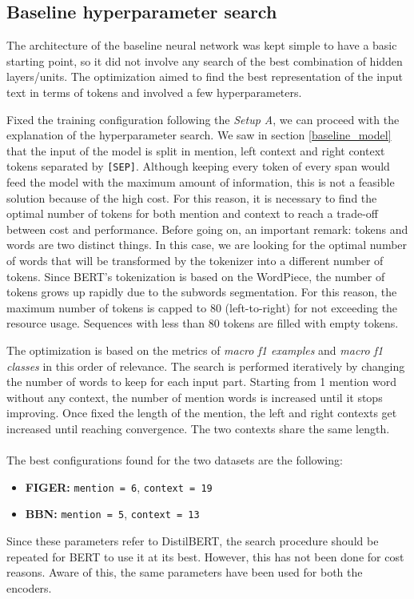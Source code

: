 \subsection{Baseline hyperparameter search}
The architecture of the baseline neural network was kept simple to have a basic starting point, so it did not involve any search of the best combination of hidden layers/units. The optimization aimed to find the best representation of the input text in terms of tokens and involved a few hyperparameters.


Fixed the training configuration following the \textit{Setup A}, we can proceed with the explanation of the hyperparameter search. We saw in section \ref{baseline_model} that the input of the model is split in mention, left context and right context tokens separated by \verb|[SEP]|. Although keeping every token of every span would feed the model with the maximum amount of information, this is not a feasible solution because of the high cost. For this reason, it is necessary to find the optimal number of tokens for both mention and context to reach a trade-off between cost and performance. Before going on, an important remark: tokens and words are two distinct things. In this case, we are looking for the optimal number of words that will be transformed by the tokenizer into a different number of tokens. Since BERT's tokenization is based on the WordPiece, the number of tokens grows up rapidly due to the subwords segmentation. For this reason, the maximum number of tokens is capped to 80 (left-to-right) for not exceeding the resource usage. Sequences with less than 80 tokens are filled with empty tokens.

The optimization is based on the metrics of \textit{macro f1 examples} and \textit{macro f1 classes} in this order of relevance. The search is performed iteratively by changing the number of words to keep for each input part. Starting from 1 mention word without any context, the number of mention words is increased until it stops improving. Once fixed the length of the mention, the left and right contexts get increased until reaching convergence. The two contexts share the same length.
\\\\
The best configurations found for the two datasets are the following:
\begin{itemize}
    \item \textbf{FIGER:} \texttt{mention = 6}, \texttt{context = 19}
    \item \textbf{BBN:} \texttt{mention = 5}, \texttt{context = 13}
\end{itemize}
Since these parameters refer to DistilBERT, the search procedure should be repeated for BERT to use it at its best. However, this has not been done for cost reasons. Aware of this, the same parameters have been used for both the encoders.